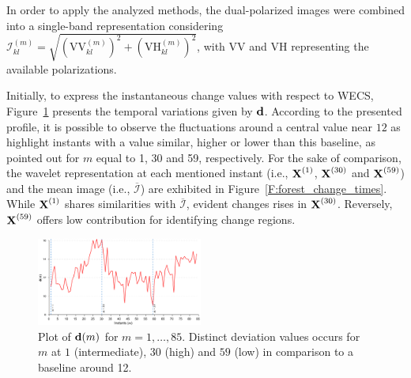 \documentclass[journal]{IEEEtran}
\newcommand{\vd}{{\textbf d}}
\newcommand{\vX}{{\textbf X}}
\begin{document}
In order to apply the analyzed methods, the dual-polarized images were combined into a single-band representation considering
$\mathcal{I}_{kl}^{(m)} = \sqrt{(\mathrm{VV}_{kl}^{(m)})^2+(\mathrm{VH}_{kl}^{(m)})^2}$, with $\mathrm{VV}$ and $\mathrm{VH}$ representing the available polarizations.


Initially, to express the instantaneous change values with respect to WECS,
Figure~\ref{F:forest_wecs} presents the temporal variations given by $\vd$. According to the presented profile, it is possible to observe the fluctuations around a central value near $12$ as highlight instants with a value similar, higher or lower than this baseline, as pointed out for $m$ equal to 1, 30 and 59, respectively.
%
For the sake of comparison, the wavelet representation at each mentioned instant (i.e., $\vX^{(1)}$, $\vX^{(30)}$ and $\vX^{(59)}$) and the mean image (i.e., $\overline{\mathcal{I}}$) are exhibited in Figure~\ref{F:forest_change_times}. While $\vX^{(1)}$ shares similarities with $\overline{\mathcal{I}}$, evident changes rises in $\vX^{(30)}$. Reversely, $\vX^{(59)}$ offers low contribution for identifying change regions.



\begin{figure}[htb!]
\centering
\includegraphics[width=0.485\textwidth]{../../graphs/LineInstants_1-30-59.pdf}
\caption{Plot of $\vd(m)$ for $m=1,\ldots,85$. Distinct deviation values occurs for $m$ at $1$ (intermediate), $30$ (high) and $59$ (low) in comparison to a baseline around 12.}\label{F:forest_wecs}
\end{figure}
\end{document}
